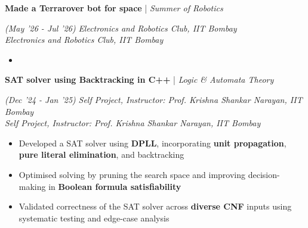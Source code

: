 \documentclass[10pt]{article}
\renewcommand{\subsection}[4]{
	\def\temp{#4}
	\vspace{2pt}
	{
		\large
		{\color{Green} \textbf{#1}} | {\sl #2} \filldate{#3}
		\ifx\temp\empty
		\else
		{
			\\[0.098em]
			\fontsize{10.5}{13.2}\selectfont
			\sl #4
		}
		\fi
	}
}
\newcommand{\filldate}[1]{\strut\hfill {\small \textit{(#1)}}}
\begin{document}
\vspace{-13px}

\subsection{Made a Terrarover bot for space}{Summer of Robotics}{May '26 - Jul '26}{\textit{Electronics and Robotics Club, IIT Bombay}}
\begin{itemize}
    \item 
\end{itemize}

\vspace{-13px}




\vspace{-2px}

\subsection{SAT solver using Backtracking in C++}{Logic \& Automata Theory}{Dec '24 - Jan '25}{\textit{Self Project, Instructor: Prof. Krishna Shankar Narayan, IIT Bombay}}
\begin{itemize}
    \item Developed a SAT solver using \textbf{DPLL}, incorporating \textbf{unit propagation}, \textbf{pure literal elimination}, and backtracking  
    \item Optimised solving by pruning the search space and improving decision-making in \textbf{Boolean formula satisfiability}
    \item Validated correctness of the SAT solver across \textbf{diverse CNF} inputs using systematic testing and edge-case analysis
\end{itemize}
\end{document}

